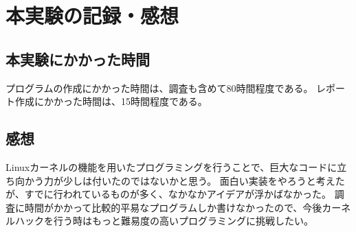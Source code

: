 \documentclass[main]{subfiles}
\begin{document}
\section{本実験の記録・感想}

\subsection{本実験にかかった時間}

プログラムの作成にかかった時間は、調査も含めて80時間程度である。
レポート作成にかかった時間は、15時間程度である。

\subsection{感想}

Linuxカーネルの機能を用いたプログラミングを行うことで、巨大なコードに立ち向かう力が少しは付いたのではないかと思う。
面白い実装をやろうと考えたが、すでに行われているものが多く、なかなかアイデアが浮かばなかった。
調査に時間がかかって比較的平易なプログラムしか書けなかったので、今後カーネルハックを行う時はもっと難易度の高いプログラミングに挑戦したい。
\end{document}
